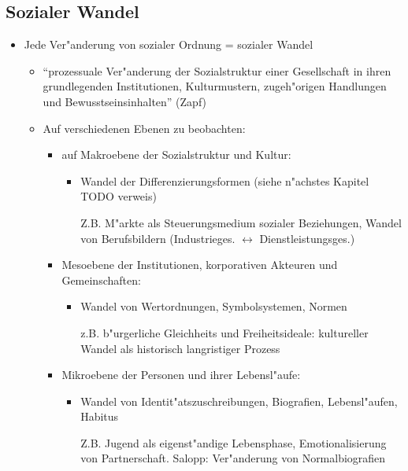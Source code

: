 \subsection{Sozialer Wandel}
\begin{itemize}
	\item
		Jede Ver"anderung von sozialer Ordnung = sozialer Wandel
		\begin{itemize}
			\item
				\enquote{prozessuale Ver"anderung der Sozialstruktur einer Gesellschaft in ihren grundlegenden Institutionen, Kulturmustern, zugeh"origen Handlungen und Bewusstseinsinhalten} (Zapf)
			\item
				Auf verschiedenen Ebenen zu beobachten:  
				\begin{itemize}
					\item auf Makroebene der Sozialstruktur und Kultur:
						\begin{itemize}
							\item
								Wandel der Differenzierungsformen (siehe n"achstes Kapitel TODO verweis)

								Z.B. M"arkte als Steuerungsmedium sozialer Beziehungen, Wandel von Berufsbildern (Industrieges. $\leftrightarrow$ Dienstleistungsges.)
						\end{itemize}

					\item
						Mesoebene der Institutionen, korporativen Akteuren und Gemeinschaften:
						\begin{itemize}
							\item
								Wandel von Wertordnungen, Symbolsystemen, Normen

								z.B. b"urgerliche Gleichheits und Freiheitsideale: kultureller Wandel als historisch langristiger Prozess
						\end{itemize}
					\item
					 Mikroebene der Personen und ihrer Lebensl"aufe:
					 \begin{itemize}
						 \item
							 Wandel von Identit"atszuschreibungen, Biografien, Lebensl"aufen, Habitus

							 Z.B. Jugend als eigenst"andige Lebensphase, Emotionalisierung von Partnerschaft. Salopp: Ver"anderung von Normalbiografien
					 \end{itemize}
				\end{itemize}


\end{itemize}
\end{itemize}

